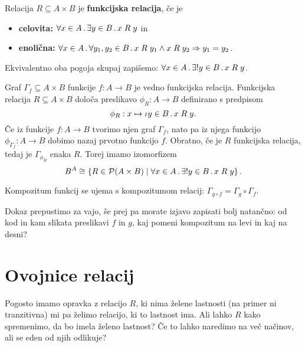 \begin{definicija}
  Relacija $R \subseteq A \times B$ je \textbf{funkcijska relacija}, če je
  \begin{itemize}
  \item \textbf{celovita:} $\forall x \in A \,.\, \exists y \in B \,.\, x \mathrel{R} y$ in
  \item \textbf{enolična:} $\forall x \in A \,.\, \forall y_1, y_2 \in B \,.\, x \mathrel{R} y_1 \land x \mathrel{R} y_2 \Rightarrow y_1 = y_2$.
  \end{itemize}
  Ekvivalentno oba pogoja skupaj zapišemo: $\forall x \in A \,.\, \exists! y \in B \,.\, x \mathrel{R} y$.
\end{definicija}

Graf $\Gamma_{\!f} \subseteq A \times B$ funkcije $f : A \to B$ je vedno funkcijska relacija.
%
Funkcijska relacija $R \subseteq A \times B$ določa preslikavo $\phi_R : A \to B$ definirano s predpisom
%
\begin{equation*}
  \phi_R : x \mapsto \iota y \in B \,.\, x \mathrel{R} y.
\end{equation*}
%
Če iz funkcije $f : A \to B$ tvorimo njen graf $\Gamma_{\!f}$, nato pa iz njega funkcijo
$\phi_{\Gamma_{\!f}} : A \to B$ dobimo nazaj prvotno funkcijo $f$. Obratno, če je $R$ funkcijska relacija, tedaj je $\Gamma_{\phi_R}$ enaka $R$. Torej imamo izomorfizem
%
\begin{equation*}
  B^A \cong \left\{ R \in \mathcal{P}(A \times B) \; \middle| \; \forall x \in A \,.\, \exists! y \in B \,.\, x \mathrel{R} y \right\}.
\end{equation*}
%

\begin{izjava}
  Kompozitum funkcij se ujema s kompozitumom relacij:
  $\Gamma_{g \circ f} = \Gamma_g \circ \Gamma_{\!f}$.
\end{izjava}

\begin{dokaz}
  Dokaz prepustimo za vajo, še prej pa morate izjavo zapisati bolj natančno: od
  kod in kam slikata preslikavi $f$ in $g$, kaj pomeni kompozitum na levi in kaj
  na desni?
\end{dokaz}


\section{Ovojnice relacij}

Pogosto imamo opravka z relacijo $R$, ki nima želene lastnosti (na primer ni
tranzitivna) mi pa želimo relacijo, ki to lastnost ima. Ali lahko $R$ kako
spremenimo, da bo imela želeno lastnost? Če to lahko naredimo na več načinov,
ali se eden od njih odlikuje?


